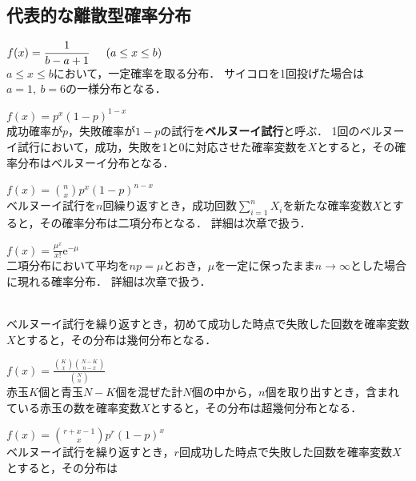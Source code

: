 \subsection{代表的な離散型確率分布}
%
\renewcommand{\arraystretch}{2}
\begin{description}
\setlength{\itemsep}{0.3cm} %
\item[一様分布：]$ \displaystyle f(x) = \frac{1}{b-a+1} \hspace{0.5cm} (a\leq x \leq b) $　\\[10pt]
%
$ a \leq x \leq b $において，一定確率を取る分布．
%
サイコロを1回投げた場合は$ a=1,\ b=6 $の一様分布となる．
%

\item[ベルヌーイ分布：]$ \displaystyle f(x) = p^{x}(1-p)^{1-x} $　\\[10pt]
%
成功確率が$ p $，失敗確率が$ 1-p $の試行を\textbf{ベルヌーイ試行}と呼ぶ．
%
1回のベルヌーイ試行において，成功，失敗を1と0に対応させた確率変数を$ X $とすると，その確率分布はベルヌーイ分布となる．
%

\item[二項分布：]$ \displaystyle f(x) = \binom{n}{x} p^{x}(1-p)^{n-x} $　\\[10pt]
%
ベルヌーイ試行を$ n $回繰り返すとき，成功回数$ \sum_{i=1}^{n}X_{i} $を新たな確率変数$ X $とすると，その確率分布は二項分布となる．
%
詳細は次章で扱う．
%


\item[ポアソン分布：]$ \displaystyle f(x) = \frac{\mu^{x}}{x!} \mathrm{e}^{-\mu} $　\\[10pt]
%
二項分布において平均を$ np = \mu $とおき，$ \mu $を一定に保ったまま$ n\to \infty $とした場合に現れる確率分布．
%
詳細は次章で扱う．
%

\item[幾何分布：$ \displaystyle f(x) = p(1-p)^{x} $ ]　\\[10pt]
%
ベルヌーイ試行を繰り返すとき，初めて成功した時点で失敗した回数を確率変数$ X $とすると，その分布は幾何分布となる．
%

\item[超幾何分布：]$ \displaystyle f(x) = \frac{\binom{K}{x}\binom{N-K}{n-x}}{\binom{N}{n}} $　\\[10pt]
%
赤玉$ K $個と青玉$ N-K $個を混ぜた計$ N $個の中から，$ n $個を取り出すとき，含まれている赤玉の数を確率変数$ X $とすると，その分布は超幾何分布となる．
%

\item[負の二項分布：]$ \displaystyle f(x)= \binom{r+x-1}{x} p^{r} (1-p)^{x} $　\\[10pt]
%
ベルヌーイ試行を繰り返すとき，$ r $回成功した時点で失敗した回数を確率変数$ X $とすると，その分布は
%
\end{description}
\renewcommand{\arraystretch}{1}
%

